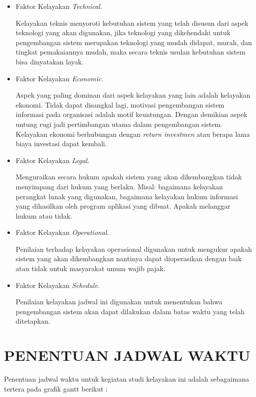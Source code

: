 \documentclass[pdftex,12pt, oneside]{article}
\begin{document}
\begin{itemize}
	\item Faktor Kelayakan \textit{Technical}. 
	
	Kelayakan teknis menyoroti kebutuhan sistem 	yang telah disusun dari aspek teknologi yang akan digunakan, jika teknologi yang dikehendaki untuk pengembangan sistem merupakan teknologi yang mudah didapat, murah, dan tingkat pemakaiannya mudah, maka secara teknis usulan kebutuhan sistem bisa dinyatakan layak.
	
	\item Faktor Kelayakan \textit{Economic}.
	
	Aspek yang paling dominan dari aspek kelayakan yang lain adalah kelayakan ekonomi. Tidak dapat disangkal lagi, motivasi pengembangan sistem informasi pada organisasi adalah motif keuntungan. Dengan demikian aspek untung rugi jadi pertimbangan utama dalam pengembangan sistem. Kelayakan ekonomi berhubungan dengan \textit{return investmen} atau berapa lama biaya investasi dapat kembali.	
	
	\item Faktor Kelayakan \textit{Legal}.
	
	Menguraikan secara hukum apakah sistem yang akan dikembangkan tidak menyimpang dari hukum yang berlaku. Misal: bagaimana kelayakan perangkat lunak yang digunakan, bagaimana kelayakan hukum informasi yang dihasilkan oleh program aplikasi yang dibuat. Apakah melanggar hukum atau tidak.	
	
	\item Faktor Kelayakan \textit{Operational}.
	
	Penilaian terhadap kelayakan operasional digunakan untuk mengukur apakah sistem yang akan dikembangkan nantinya dapat dioperasikan dengan baik atau tidak untuk masyarakat umum wajib pajak.	
	
	\item Faktor Kelayakan \textit{Schedule}.
	
	Penilaian kelayakan jadwal ini digunakan untuk menentukan bahwa pengembangan sistem akan dapat dilakukan dalam batas waktu yang telah ditetapkan.	
	
\end{itemize}

\section{PENENTUAN JADWAL WAKTU}

Penentuan jadwal waktu untuk kegiatan studi kelayakan ini adalah sebagaimana tertera pada grafik gantt berikut :
\end{document}
